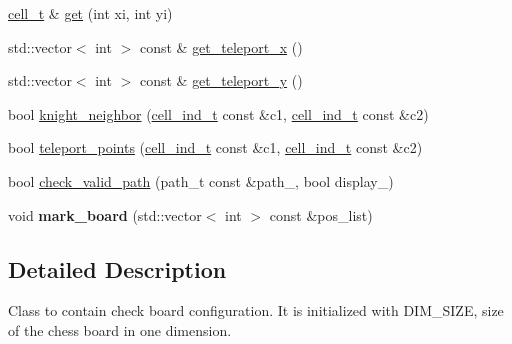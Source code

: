 \begin{DoxyCompactItemize}
\item 
\hyperlink{structknight__path__t_1_1cell__t}{cell\-\_\-t} \& \hyperlink{classknight__path__t_1_1board__t_aab347f7c288d225d586df3199c76da48}{get} (int xi, int yi)
\item 
std\-::vector$<$ int $>$ const \& \hyperlink{classknight__path__t_1_1board__t_a87c807b5c36126f7d94ac1b26cea35cd}{get\-\_\-teleport\-\_\-x} ()
\item 
std\-::vector$<$ int $>$ const \& \hyperlink{classknight__path__t_1_1board__t_a40fb60235f4416d8f8215bbc3611a30d}{get\-\_\-teleport\-\_\-y} ()
\item 
bool \hyperlink{classknight__path__t_1_1board__t_a1522ebb77be2ffd6a6e5975177769b67}{knight\-\_\-neighbor} (\hyperlink{structknight__path__t_1_1cell__ind__t}{cell\-\_\-ind\-\_\-t} const \&c1, \hyperlink{structknight__path__t_1_1cell__ind__t}{cell\-\_\-ind\-\_\-t} const \&c2)
\item 
bool \hyperlink{classknight__path__t_1_1board__t_a29e73f2b8e995523f3a75ea47f043e7d}{teleport\-\_\-points} (\hyperlink{structknight__path__t_1_1cell__ind__t}{cell\-\_\-ind\-\_\-t} const \&c1, \hyperlink{structknight__path__t_1_1cell__ind__t}{cell\-\_\-ind\-\_\-t} const \&c2)
\item 
bool \hyperlink{classknight__path__t_1_1board__t_a43c81209ea3d042a8ff0d05e47d45d41}{check\-\_\-valid\-\_\-path} (path\-\_\-t const \&path\-\_\-, bool display\-\_\-)
\item 
\hypertarget{classknight__path__t_1_1board__t_adefbaaacef6c63eac325d574e586ebe8}{void {\bfseries mark\-\_\-board} (std\-::vector$<$ int $>$ const \&pos\-\_\-list)}\label{classknight__path__t_1_1board__t_adefbaaacef6c63eac325d574e586ebe8}

\end{DoxyCompactItemize}


\subsection{\-Detailed \-Description}
\-Class to contain check board configuration. \-It is initialized with \-D\-I\-M\-\_\-\-S\-I\-Z\-E, size of the chess board in one dimension. 

